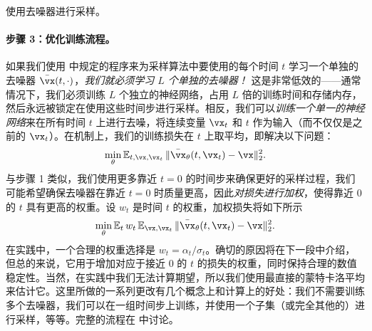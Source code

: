 \documentclass[../../book-main_zh.tex]{subfiles}
\begin{document}
\begin{algorithm}
	\caption{使用去噪器进行采样。}
	\label{alg:iterative_denoising}
	\begin{algorithmic}[1]
		 
		\EndFor
		\EndFunction
	\end{algorithmic}
\end{algorithm}

\paragraph{步骤 3：优化训练流程。} 如果我们使用  中规定的程序来为采样算法中要使用的每个时间 \(t\) 学习一个单独的去噪器 \(\bar{\vx}(t, \cdot)\)，\textit{我们就必须学习 \(L\) 个单独的去噪器！} 这是非常低效的——通常情况下，我们必须训练 \(L\) 个独立的神经网络，占用 \(L\) 倍的训练时间和存储内存，然后永远被锁定在使用这些时间步进行采样。相反，我们可以\textit{训练一个单一的神经网络}来在所有时间 \(t\) 上进行去噪，将连续变量 \(\vx_{t}\) 和 \(t\) 作为输入（而不仅仅是之前的 \(\vx_{t}\)）。在机制上，我们的训练损失在 \(t\) 上取平均，即解决以下问题：
\begin{equation}
	\min_{\theta}\Ex_{t, \vx, \vx_{t}}\norm{\bar{\vx}_{\theta}(t, \vx_{t}) - \vx}_{2}^{2}.
\end{equation}
与步骤 1 类似，我们使用更多靠近 \(t = 0\) 的时间步来确保更好的采样过程，我们可能希望确保去噪器在靠近 \(t = 0\) 时质量更高，因此\textit{对损失进行加权}，使得靠近 \(0\) 的 \(t\) 具有更高的权重。设 \(w_{t}\) 是时间 \(t\) 的权重，加权损失将如下所示
\begin{equation}\label{eq:parametric_denoising_loss}
	\min_{\theta}\Ex_{t}w_{t}\Ex_{\vx, \vx_{t}}\norm{\bar{\vx}_{\theta}(t, \vx_{t}) - \vx}_{2}^{2}.
\end{equation}
在实践中，一个合理的权重选择是 \(w_{t} = \alpha_{t}/\sigma_{t}\)。确切的原因将在下一段中介绍，但总的来说，它用于增加对应于接近 \(0\) 的 \(t\) 的损失的权重，同时保持合理的数值稳定性。当然，在实践中我们无法计算期望，所以我们使用最直接的蒙特卡洛平均来估计它。这里所做的一系列更改有几个概念上和计算上的好处：我们不需要训练多个去噪器，我们可以在一组时间步上训练，并使用一个子集（或完全其他的）进行采样，等等。完整的流程在  中讨论。
\end{document}
